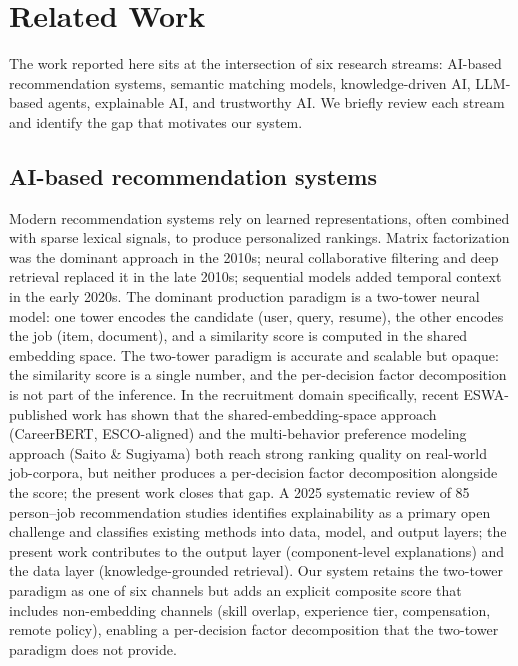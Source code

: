 \section{Related Work}\label{sec:2}

The work reported here sits at the intersection of six research streams: AI-based recommendation systems, semantic matching models, knowledge-driven AI, LLM-based agents, explainable AI, and trustworthy AI.
We briefly review each stream and identify the gap that motivates our system.

\subsection{AI-based recommendation systems}
Modern recommendation systems rely on learned representations, often combined with sparse lexical signals, to produce personalized rankings.
Matrix factorization \citep{koren2009matrix} was the dominant approach in the 2010s; neural collaborative filtering \citep{he2017neural} and deep retrieval \citep{covington2016deep,le2020cold} replaced it in the late 2010s; sequential models \citep{hidasi2015session} added temporal context in the early 2020s.
The dominant production paradigm is a two-tower neural model: one tower encodes the candidate (user, query, resume), the other encodes the job (item, document), and a similarity score is computed in the shared embedding space.
The two-tower paradigm is accurate and scalable but opaque: the similarity score is a single number, and the per-decision factor decomposition is not part of the inference.
In the recruitment domain specifically, recent ESWA-published work \citep{lavi2025careerbert,saito2024leveraging} has shown that the shared-embedding-space approach (CareerBERT, ESCO-aligned) and the multi-behavior preference modeling approach (Saito \& Sugiyama) both reach strong ranking quality on real-world job-corpora, but neither produces a per-decision factor decomposition alongside the score; the present work closes that gap.
A 2025 systematic review of 85 person--job recommendation studies \citep{tang2025explainable} identifies explainability as a primary open challenge and classifies existing methods into data, model, and output layers; the present work contributes to the output layer (component-level explanations) and the data layer (knowledge-grounded retrieval).
Our system retains the two-tower paradigm as one of six channels but adds an explicit composite score that includes non-embedding channels (skill overlap, experience tier, compensation, remote policy), enabling a per-decision factor decomposition that the two-tower paradigm does not provide.

